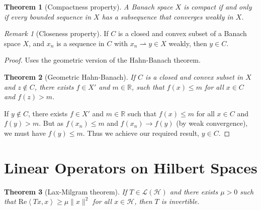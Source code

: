 \documentclass[10pt, oneside, reqno]{amsart}
\theoremstyle{plain}%
\newtheorem{thm}{Theorem}[section]
\numberwithin{equation}{section}
\theoremstyle{definition}
\theoremstyle{remark}
\newtheorem*{rem}{Remark}
\newcommand{\R}{\mathbb{R}}
\newcommand{\iprod}[1]{\left\langle #1 \right\rangle}
\renewcommand{\Re}{\text{Re}}
\begin{document}
\begin{thm}[Compactness property]
    A Banach space $X$ is compact if and only if every bounded sequence in $X$ has a subsequence that converges weakly in $X$.
\end{thm}

\begin{rem}[Closeness property]
    If $C$ is a closed and convex subset of a Banach space $X$, and $x_n$ is a sequence in $C$ with $x_n \rightharpoonup y \in X$ weakly, then $y \in C$.   
\end{rem}

\begin{proof}
    Uses the geometric version of the Hahn-Banach theorem. 
    
    \begin{thm}[Geometric Hahn-Banach]
        If $C$ is a closed and convex subset in $X$ and $z \notin C$, there exists $f \in X'$ and $m \in \R$, such that $f(x) \leq m$ for all $x \in C$ and $f(z) > m$. 
    \end{thm}
    
    If $y \notin C$, there exists $f \in X'$ and $m \in \R$ such that $f(x) \leq m$ for all $x \in C$ and $f(y) > m$.  But as $f(x_n) \leq m$ and $f(x_n) \rightarrow f(y)$ (by weak convergence), we must have $f(y) \leq m$.  Thus we achieve our required result, $y \in C$.  
\end{proof}


\section{Linear Operators on Hilbert Spaces} %
\label{sec:linear_operators_on_hilbert_spaces}

\begin{thm}[Lax-Milgram theorem]
    \label{thm:lax_milgram}
    If $T \in \mathcal L(\mathcal H)$ and there exists $\mu > 0$ such that $\Re \iprod{Tx, x} \geq \mu \| x \|^2$ for all $x \in \mathcal H$, then $T$ is invertible.  
\end{thm}
\end{document}
